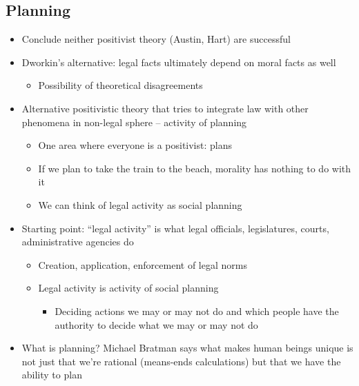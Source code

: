 \hypertarget{planning}{%
\subsection{Planning}\label{planning}}

\begin{itemize}
\tightlist
\item
  Conclude neither positivist theory (Austin, Hart) are successful
\item
  Dworkin's alternative: legal facts ultimately depend on moral facts as
  well

  \begin{itemize}
  \tightlist
  \item
    Possibility of theoretical disagreements
  \end{itemize}
\item
  Alternative positivistic theory that tries to integrate law with other
  phenomena in non-legal sphere -- activity of planning

  \begin{itemize}
  \tightlist
  \item
    One area where everyone is a positivist: plans
  \item
    If we plan to take the train to the beach, morality has nothing to
    do with it
  \item
    We can think of legal activity as social planning
  \end{itemize}
\item
  Starting point: ``legal activity'' is what legal officials,
  legislatures, courts, administrative agencies do

  \begin{itemize}
  \tightlist
  \item
    Creation, application, enforcement of legal norms
  \item
    Legal activity is activity of social planning

    \begin{itemize}
    \tightlist
    \item
      Deciding actions we may or may not do and which people have the
      authority to decide what we may or may not do
    \end{itemize}
  \end{itemize}
\item
  What is planning? Michael Bratman says what makes human beings unique
  is not just that we're rational (means-ends calculations) but that we
  have the ability to plan


\end{itemize}
